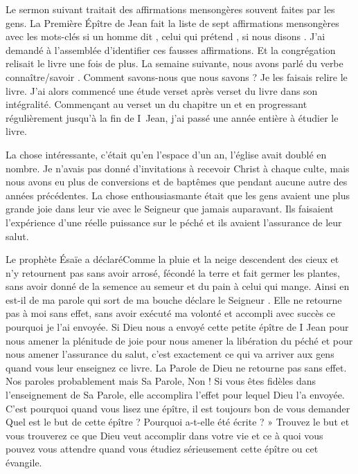 Le sermon suivant traitait des affirmations mensongères souvent faites par les gens. La Première Épître de Jean fait la
liste de sept affirmations mensongères avec les mots-clés \og si un homme dit \fg{}, \og celui qui prétend \fg{}, \og si nous disons \fg{}. J'ai
demandé à l’assemblée d'identifier ces fausses affirmations. Et la congrégation relisait le livre une fois de plus. La
semaine suivante, nous avons parlé du verbe \og connaître/savoir \fg{}. Comment savons-nous que nous savons ? Je les
faisais relire le livre. J'ai alors commencé une étude \og verset après verset \fg{} du livre dans son intégralité. Commençant
au verset un du chapitre un
et en progressant régulièrement jusqu'à la fin de I~Jean, j'ai passé une
année entière à étudier le livre.

La chose intéressante, c'était qu’en l’espace d’un an, l’église avait doublé en nombre. Je n’avais pas donné
d’invitations à recevoir Christ à chaque culte, mais nous avons eu plus de conversions et de baptêmes que pendant
aucune autre des années précédentes. La chose enthousiasmante était que les gens avaient une plus grande joie
dans leur vie avec le Seigneur que jamais auparavant. Ils faisaient l’expérience d’une réelle puissance sur le péché et
ils avaient l’assurance de leur salut.

Le prophète Ésaïe a déclaré\frcolon\og Comme la pluie et la neige descendent des cieux et n’y retournent pas sans avoir
arrosé, fécondé la terre et fait germer les plantes, sans avoir donné de la semence au semeur et du pain à celui qui
mange. Ainsi en est-il de ma parole qui sort de ma bouche\fg{} déclare le Seigneur \og . \og Elle ne retourne pas à moi sans
effet, sans avoir exécuté ma volonté et accompli avec succès ce pourquoi je l’ai envoyée.\fg{} Si Dieu nous a envoyé
cette petite épître de I Jean pour nous amener la plénitude de joie pour nous amener la libération du péché et pour
nous amener l’assurance du salut, c’est exactement ce qui va arriver aux gens quand vous leur enseignez ce livre. La
Parole de Dieu ne retourne pas sans effet. Nos paroles probablement mais Sa Parole, Non ! Si vous êtes fidèles dans
l’enseignement de Sa Parole, elle accomplira l’effet pour lequel Dieu l’a envoyée. C’est pourquoi quand vous lisez une
épître, il est toujours bon de vous demander \og Quel est le but de cette épître ? Pourquoi a-t-elle été écrite ? » Trouvez
le but et vous trouverez ce que Dieu veut accomplir dans votre vie et ce à quoi vous pouvez vous attendre quand
vous étudiez sérieusement cette épître ou cet évangile.

